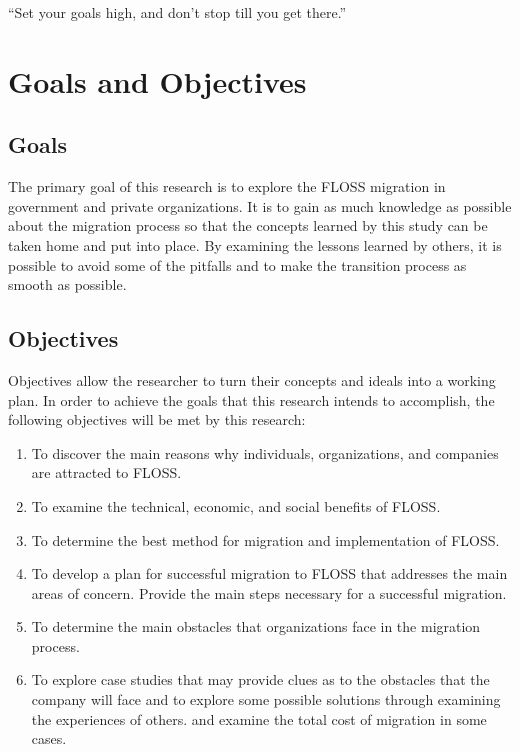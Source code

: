       \cleardoublepage


      \begin{savequote}[108mm]
       ``Set your goals high, and don't stop till you get there.''
      \end{savequote}

      \chapter{Goals and Objectives}
      \vspace{-3cm}
      \label{chap:Goals}




\section{Goals} 

The primary goal of this research is to explore the FLOSS migration in government and private organizations. It is to gain as much knowledge as possible about the migration process so that the concepts learned by this study can be taken home and put into place. By examining the lessons learned by others, it is possible to avoid some of the pitfalls and to make the transition process as smooth as possible.          
                                                                                        
\section{Objectives}
Objectives allow the researcher to turn their concepts and ideals into a working plan. In order to achieve the goals that this research intends to accomplish, the following objectives will be met by this research:

\begin{enumerate}
\item To discover the main reasons why individuals, organizations, and companies are attracted to FLOSS. 
\item To examine the technical, economic, and social benefits of FLOSS.
\item To determine the best method for migration and implementation of FLOSS.
\item To develop a plan for successful migration to FLOSS that addresses the main areas of concern. Provide the main steps necessary for a successful migration.
\item To determine  the main obstacles that organizations face in the migration process.
\item To explore case studies that may provide clues as to the obstacles that the company will face and to explore some possible solutions through examining the experiences of others. and examine the total cost of migration in some cases.
\end{enumerate}
